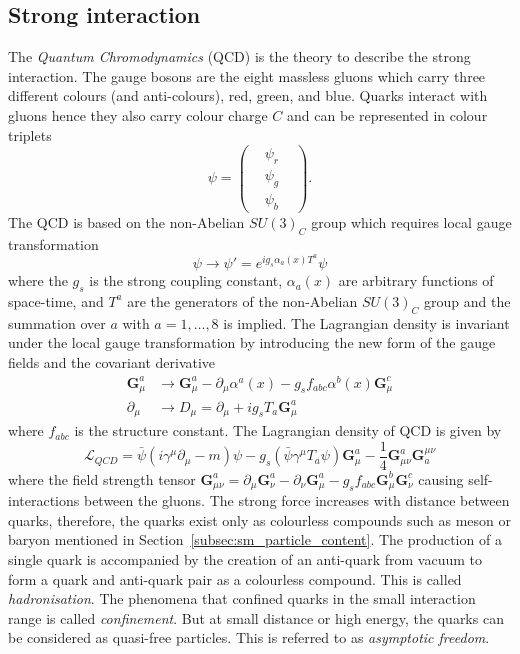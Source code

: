 \subsection{Strong interaction}
\label{subsec:sm_strong_interaction}
The \textit{Quantum Chromodynamics} (QCD) is the theory to describe the strong interaction.
The gauge bosons are the eight massless gluons which carry three different colours (and anti-colours), red, green, and blue.
Quarks interact with gluons hence they also carry colour charge $C$ and can be represented in colour triplets
%
\begin{equation}
\psi = 
\left(
\begin{matrix}
& \psi_{r} & \\
& \psi_{g} & \\
& \psi_{b} &
\end{matrix}
\right).
\label{eq:sm_quark_triplets}
\end{equation}
%
The QCD is based on the non-Abelian $SU(3)_{C}$ group which requires local gauge transformation
%
\begin{equation}
\psi \rightarrow \psi' = e^{i g_{s} \alpha_{a}(x) T^{a}}\psi
\label{eq:sm_qcd_gauge_transformation_1}
\end{equation}
%
where the $g_{s}$ is the strong coupling constant, $\alpha_{a}(x)$ are arbitrary functions of space-time, and $T^{a}$ are the generators of the non-Abelian $SU(3)_{C}$ group and the summation over $a$ with $a = 1, \dots, 8$ is implied.
The Lagrangian density is invariant under the local gauge transformation by introducing the new form of the gauge fields and the covariant derivative
%
\begin{align}
\bm{G}_{\mu}^{a} & \rightarrow \bm{G}_{\mu}^{a} -  \partial_{\mu} \alpha^{a}(x) - g_{s} f_{abc} \alpha^{b}(x) \bm{G}_{\mu}^{c} \\
\partial_{\mu} & \rightarrow D_{\mu} = \partial_{\mu} + i g_{s} T_{a} \bm{G}_{\mu}^{a}
\label{eq:sm_qcd_gauge_transformation_2}
\end{align}
%
where $f_{abc}$ is the structure constant. 
The Lagrangian density of QCD is given by
%
\begin{equation}
\mathcal{L}_{QCD} = \bar{\psi}(i \gamma^{\mu} \partial_{\mu} - m) \psi - g_{s} ( \bar{\psi} \gamma^{\mu} T_{a} \psi) \bm{G}_{\mu}^{a} - \frac{1}{4} \bm{G}_{\mu\nu}^{a} \bm{G}_{a}^{\mu\nu}
\label{eq:sm_qcd_lagrangian}
\end{equation}
%
where the field strength tensor $\bm{G}_{\mu\nu}^{a} = \partial_{\mu} \bm{G}_{\nu}^{a} - \partial_{\nu} \bm{G}_{\mu}^{a} - g_{s} f_{abc} \bm{G}_{\mu}^{b} \bm{G}_{\nu}^{c}$ causing self-interactions between the gluons.
The strong force increases with distance between quarks, therefore, the quarks exist only as colourless compounds such as meson or baryon mentioned in Section~\ref{subsec:sm_particle_content}.
The production of a single quark is accompanied by the creation of an anti-quark from vacuum to form a quark and anti-quark pair as a colourless compound.
This is called \textit{hadronisation}.
The phenomena that confined quarks in the small interaction range is called \textit{confinement}.
But at small distance or high energy, the quarks can be considered as quasi-free particles.
This is referred to as \textit{asymptotic freedom}.

